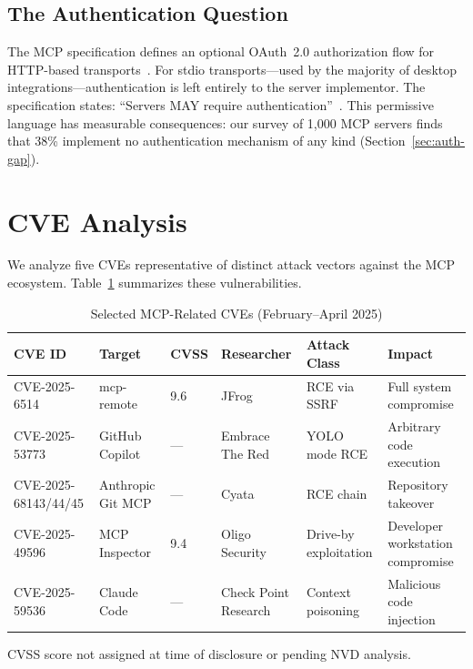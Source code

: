 \documentclass[11pt,twocolumn]{article}
\begin{document}
\subsection{The Authentication Question}

The MCP specification defines an optional OAuth~2.0 authorization flow for HTTP-based transports~\cite{mcp-spec}. For stdio transports---used by the majority of desktop integrations---authentication is left entirely to the server implementor. The specification states: ``Servers MAY require authentication''~\cite{mcp-spec}. This permissive language has measurable consequences: our survey of 1,000 MCP servers finds that 38\% implement no authentication mechanism of any kind (Section~\ref{sec:auth-gap}).

\section{CVE Analysis}
\label{sec:cve-analysis}

We analyze five CVEs representative of distinct attack vectors against the MCP ecosystem. Table~\ref{tab:cves} summarizes these vulnerabilities.

\begin{table}[t]
\centering
\caption{Selected MCP-Related CVEs (February--April 2025)}
\label{tab:cves}
\begin{threeparttable}
\begin{tabular}{@{}llllll@{}}
\toprule
\textbf{CVE ID} & \textbf{Target} & \textbf{CVSS} & \textbf{Researcher} & \textbf{Attack Class} & \textbf{Impact} \\
\midrule
CVE-2025-6514 & mcp-remote & 9.6 & JFrog & RCE via SSRF & Full system compromise \\
CVE-2025-53773 & GitHub Copilot & ---\tnote{a} & Embrace The Red & YOLO mode RCE & Arbitrary code execution \\
CVE-2025-68143/44/45 & Anthropic Git MCP & ---\tnote{a} & Cyata & RCE chain & Repository takeover \\
CVE-2025-49596 & MCP Inspector & 9.4 & Oligo Security & Drive-by exploitation & Developer workstation compromise \\
CVE-2025-59536 & Claude Code & ---\tnote{a} & Check Point Research & Context poisoning & Malicious code injection \\
\bottomrule
\end{tabular}
\begin{tablenotes}
\footnotesize
\item[a] CVSS score not assigned at time of disclosure or pending NVD analysis.
\end{tablenotes}
\end{threeparttable}
\end{table}
\end{document}
